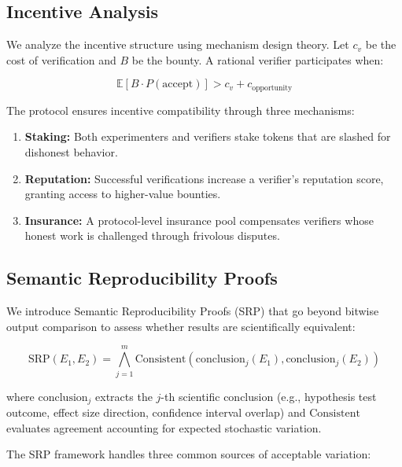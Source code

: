 \documentclass[11pt,a4paper]{article}
\begin{document}
\subsection{Incentive Analysis}

We analyze the incentive structure using mechanism design theory.
Let $c_v$ be the cost of verification and $B$ be the bounty.
A rational verifier participates when:

\begin{equation}
    \mathbb{E}[B \cdot P(\text{accept})] > c_v + c_{\text{opportunity}}
\end{equation}

The protocol ensures incentive compatibility through three mechanisms:

\begin{enumerate}[leftmargin=*]
    \item \textbf{Staking:} Both experimenters and verifiers stake tokens that are slashed for dishonest behavior.
    \item \textbf{Reputation:} Successful verifications increase a verifier's reputation score, granting access to higher-value bounties.
    \item \textbf{Insurance:} A protocol-level insurance pool compensates verifiers whose honest work is challenged through frivolous disputes.
\end{enumerate}

\subsection{Semantic Reproducibility Proofs}

We introduce Semantic Reproducibility Proofs (SRP) that go beyond bitwise output comparison to assess whether results are scientifically equivalent:

\begin{equation}
    \text{SRP}(E_1, E_2) = \bigwedge_{j=1}^{m} \text{Consistent}(\text{conclusion}_j(E_1), \text{conclusion}_j(E_2))
\end{equation}

\noindent where $\text{conclusion}_j$ extracts the $j$-th scientific conclusion (e.g., hypothesis test outcome, effect size direction, confidence interval overlap) and $\text{Consistent}$ evaluates agreement accounting for expected stochastic variation.

The SRP framework handles three common sources of acceptable variation:
\end{document}
